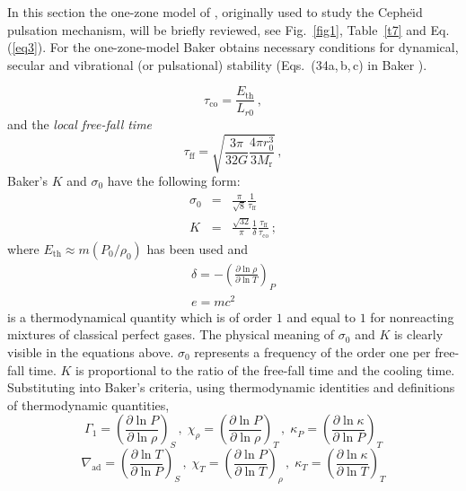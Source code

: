 \documentclass{aa}
\begin{document}
   In this section the one-zone model of \citet{baker},
   originally used to study the Cephe{\"{\i}}d pulsation mechanism, will
   be briefly reviewed, see Fig.~\ref{fig1}, Table~\ref{t7} and Eq. (\ref{eq3}).
   For the one-zone-model Baker obtains necessary conditions
   for dynamical, secular and vibrational (or pulsational)
   stability (Eqs.\ (34a,\,b,\,c) in Baker \citeyear{baker}).
   
   \begin{equation}
    \label{eq1}
      \tau_{\mathrm{co}} = \frac{E_{\mathrm{th}}}{L_{r0}} \,,
   \end{equation}
   and the \emph{local free-fall time}
   \begin{equation}
      \tau_{\mathrm{ff}} =
         \sqrt{ \frac{3 \pi}{32 G} \frac{4\pi r_0^3}{3 M_{\mathrm{r}}}
}\,,
   \end{equation}
   Baker's $K$ and $\sigma_0$ have the following form:
   \begin{eqnarray}
   \label{eq3}
      \sigma_0 & = & \frac{\pi}{\sqrt{8}}
                     \frac{1}{ \tau_{\mathrm{ff}}} \\
      K        & = & \frac{\sqrt{32}}{\pi} \frac{1}{\delta}
                        \frac{ \tau_{\mathrm{ff}} }
                             { \tau_{\mathrm{co}} }\,;
   \end{eqnarray}
   where $ E_{\mathrm{th}} \approx m (P_0/{\rho_0})$ has been used and
   \begin{equation}
   \begin{array}{l}
      \delta = - \left(
                    \frac{ \partial \ln \rho }{ \partial \ln T }
                 \right)_P \\
      e=mc^2
   \end{array}
   \end{equation}
   is a thermodynamical quantity which is of order $1$ and equal to $1$
   for nonreacting mixtures of classical perfect gases. The physical
   meaning of $ \sigma_0 $ and $K$ is clearly visible in the equations
   above. $\sigma_0$ represents a frequency of the order one per
   free-fall time. $K$ is proportional to the ratio of the free-fall
   time and the cooling time. Substituting into Baker's criteria, using
   thermodynamic identities and definitions of thermodynamic quantities,
   \begin{displaymath}
      \Gamma_1      = \left( \frac{ \partial \ln P}{ \partial\ln \rho}
                           \right)_{S}    \, , \;
      \chi^{}_\rho  = \left( \frac{ \partial \ln P}{ \partial\ln \rho}
                           \right)_{T}    \, , \;
      \kappa^{}_{P} = \left( \frac{ \partial \ln \kappa}{ \partial\ln P}
                           \right)_{T}
   \end{displaymath}
   \begin{displaymath}
      \nabla_{\mathrm{ad}} = \left( \frac{ \partial \ln T}
                             { \partial\ln P} \right)_{S} \, , \;
      \chi^{}_T       = \left( \frac{ \partial \ln P}
                             { \partial\ln T} \right)_{\rho} \, , \;
      \kappa^{}_{T}   = \left( \frac{ \partial \ln \kappa}
                             { \partial\ln T} \right)_{T}
   \end{displaymath}
\end{document}
